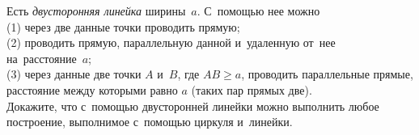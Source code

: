 \begin{problems}
\item
Есть \emph{двусторонняя линейка} ширины~$a$.
С~помощью нее можно
\\
(1)\enspace
через две данные точки проводить прямую;
\\
(2)\enspace
проводить прямую, параллельную данной и~удаленную от~нее на~расстояние~$a$;
\\
(3)\enspace
через данные две точки $A$ и~$B$, где $AB \geq a$, проводить параллельные
прямые, расстояние между которыми равно $a$ (таких пар прямых две).
\\
Докажите, что с~помощью двусторонней линейки можно выполнить любое построение,
выполнимое с~помощью циркуля и~линейки.

\end{problems}

